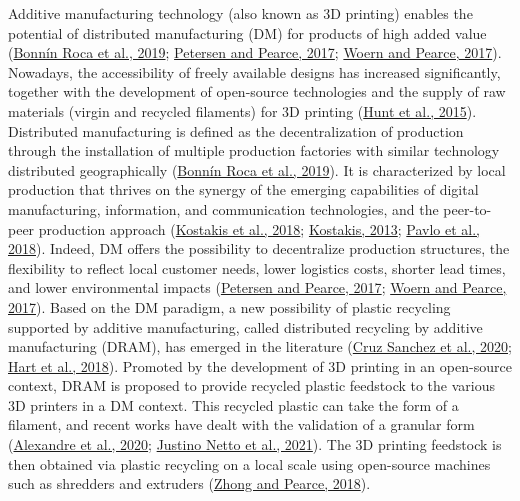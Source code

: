 \documentclass[12pt]{elsarticle} %
\begin{document}
Additive manufacturing technology (also known as 3D printing) enables the potential of distributed manufacturing (DM) for products of high added value (\protect\hyperlink{ref-BonninRoca2019}{Bonnín Roca et al., 2019}; \protect\hyperlink{ref-Petersen2017a}{Petersen and Pearce, 2017}; \protect\hyperlink{ref-Woern2017}{Woern and Pearce, 2017}).
Nowadays, the accessibility of freely available designs has increased significantly, together with the development of open-source technologies and the supply of raw materials (virgin and recycled filaments) for 3D printing (\protect\hyperlink{ref-Hunt2015}{Hunt et al., 2015}).
Distributed manufacturing is defined as the decentralization of production through the installation of multiple production factories with similar technology distributed geographically (\protect\hyperlink{ref-BonninRoca2019}{Bonnín Roca et al., 2019}).
It is characterized by local production that thrives on the synergy of the emerging capabilities of digital manufacturing, information, and communication technologies, and the peer-to-peer production approach (\protect\hyperlink{ref-Kostakis2018}{Kostakis et al., 2018}; \protect\hyperlink{ref-Kostakis2013b}{Kostakis, 2013}; \protect\hyperlink{ref-Pavlo2018}{Pavlo et al., 2018}).
Indeed, DM offers the possibility to decentralize production structures, the flexibility to reflect local customer needs, lower logistics costs, shorter lead times, and lower environmental impacts (\protect\hyperlink{ref-Petersen2017a}{Petersen and Pearce, 2017}; \protect\hyperlink{ref-Woern2017}{Woern and Pearce, 2017}).
Based on the DM paradigm, a new possibility of plastic recycling supported by additive manufacturing, called distributed recycling by additive manufacturing (DRAM), has emerged in the literature (\protect\hyperlink{ref-CruzSanchez2020}{Cruz Sanchez et al., 2020}; \protect\hyperlink{ref-Hart2018}{Hart et al., 2018}).
Promoted by the development of 3D printing in an open-source context, DRAM is proposed to provide recycled plastic feedstock to the various 3D printers in a DM context.
This recycled plastic can take the form of a filament, and recent works have dealt with the validation of a granular form (\protect\hyperlink{ref-Arthur2020}{Alexandre et al., 2020}; \protect\hyperlink{ref-JustinoNetto2021}{Justino Netto et al., 2021}).
The 3D printing feedstock is then obtained via plastic recycling on a local scale using open-source machines such as shredders and extruders (\protect\hyperlink{ref-Zhong2018}{Zhong and Pearce, 2018}).
\end{document}
